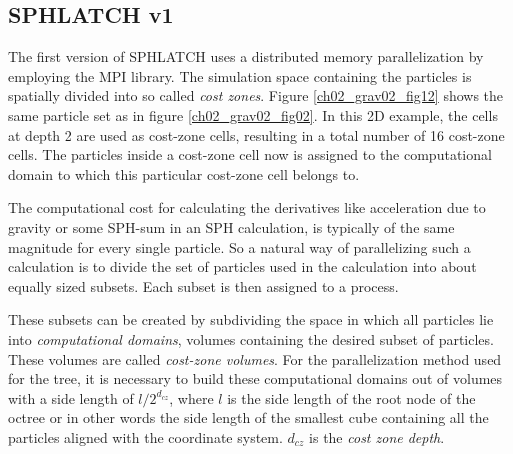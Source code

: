 \subsection{SPHLATCH v1}
The first version of SPHLATCH uses a distributed memory parallelization by employing the MPI library. The simulation space containing the particles is spatially divided into so called \emph{cost zones}. Figure \ref{ch02_grav02_fig12} shows the same particle set as in figure \ref{ch02_grav02_fig02}. In this 2D example, the cells at depth 2 are used as cost-zone cells, resulting in a total number of 16 cost-zone cells. The particles inside a cost-zone cell now is assigned to the computational domain to which this particular cost-zone cell belongs to.


The computational cost for calculating the derivatives like acceleration due to gravity or some SPH-sum in an SPH calculation, is typically of the same magnitude for every single particle. So a natural way of parallelizing such a calculation is to divide the set of particles used in the calculation into about equally sized subsets. Each subset is then assigned to a process. 


These subsets can be created by subdividing the space in which all particles lie into \emph{computational domains}, volumes containing the desired subset of particles. These volumes are called \emph{cost-zone volumes}. For the parallelization method used for the tree, it is necessary to build these computational domains out of volumes with a side length of $l / 2^{d_{cz}}$, where $l$ is the side length of the root node of the octree or in other words the side length of the smallest cube containing all the particles aligned with the coordinate system. $d_{cz}$ is the \emph{cost zone depth}.




